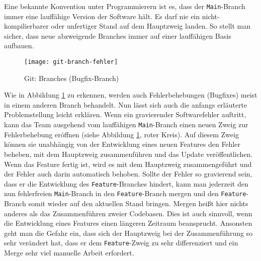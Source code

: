 Eine bekannte Konvention unter Programmierern ist es, dass der
\texttt{Main}-Branch immer eine lauffähige Version der Software hält. Es darf
nie ein nicht-kompilierbarer oder unfertiger Stand auf dem Hauptzweig landen.
So stellt man sicher, dass neue abzweigende Branches immer auf einer
lauffähigen Basis aufbauen.

\begin{figure}[H]
    \centering
    \texttt{[image: git-branch-fehler]}
    \caption{Git: Branches (Bugfix-Branch)}
    \label{fig:git-branch-fehler}
\end{figure}

Wie in Abbildung \ref{fig:git-branch-fehler} zu erkennen, werden auch
Fehlerbehebungen (Bugfixes) meist in einem anderen Branch behandelt. Nun lässt
sich auch die anfangs erläuterte Problemstellung leicht erklären. Wenn ein 
gravierender Softwarefehler auftritt, kann das Team ausgehend vom lauffähigen
\texttt{Main}-Branch einen neuen Zweig zur Fehlerbehebung eröffnen (siehe
Abbildung \ref{fig:git-branch-fehler}, roter Kreis). Auf diesem Zweig können sie
unabhängig von der Entwicklung eines neuen Features den Fehler beheben, mit dem
Hauptzweig zusammenführen und das Update veröffentlichen. Wenn das Feature
fertig ist, wird es mit dem Hauptzweig zusammengeführt und der Fehler auch darin
automatisch behoben. Sollte der Fehler so gravierend sein, dass er die
Entwicklung des \texttt{Feature}-Branches hindert, kann man jederzeit den nun
fehlerfreien \texttt{Main}-Branch in den \texttt{Feature}-Branch mergen und den
\texttt{Feature}-Branch somit wieder auf den aktuellen Stand bringen. Mergen
heißt hier nichts anderes als das Zusammenführen zweier Codebasen. Dies ist auch
sinnvoll, wenn die Entwicklung eines Features einen längeren Zeitraum
beansprucht. Ansonsten geht man die Gefahr ein, dass sich der Hauptzweig bei der
Zusammenführung so sehr verändert hat, dass er dem \texttt{Feature}-Zweig zu
sehr differenziert und ein Merge sehr viel manuelle Arbeit erfordert.
